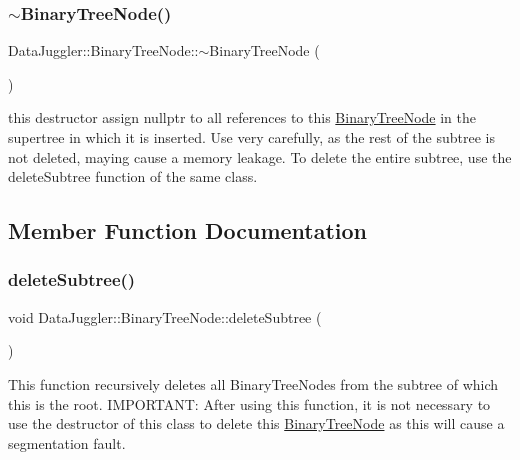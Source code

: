 \subsubsection{\texorpdfstring{$\sim$\+Binary\+Tree\+Node()}{~BinaryTreeNode()}}
{\footnotesize\ttfamily Data\+Juggler\+::\+Binary\+Tree\+Node\+::$\sim$\+Binary\+Tree\+Node (\begin{DoxyParamCaption}{ }\end{DoxyParamCaption})\hspace{0.3cm}{\ttfamily [virtual]}}

this destructor assign nullptr to all references to this \hyperlink{classDataJuggler_1_1BinaryTreeNode}{Binary\+Tree\+Node} in the supertree in which it is inserted. Use very carefully, as the rest of the subtree is not deleted, maying cause a memory leakage. To delete the entire subtree, use the delete\+Subtree function of the same class. 

\subsection{Member Function Documentation}
\mbox{\label{classDataJuggler_1_1BinaryTreeNode_a563663d605400e2a928df19fd086bf9a}} 
\subsubsection{\texorpdfstring{delete\+Subtree()}{deleteSubtree()}}
{\footnotesize\ttfamily void Data\+Juggler\+::\+Binary\+Tree\+Node\+::delete\+Subtree (\begin{DoxyParamCaption}{ }\end{DoxyParamCaption})\hspace{0.3cm}{\ttfamily [virtual]}}

This function recursively deletes all Binary\+Tree\+Nodes from the subtree of which this is the root. I\+M\+P\+O\+R\+T\+A\+NT\+: After using this function, it is not necessary to use the destructor of this class to delete this \hyperlink{classDataJuggler_1_1BinaryTreeNode}{Binary\+Tree\+Node} as this will cause a segmentation fault. \mbox{\label{classDataJuggler_1_1BinaryTreeNode_a98ff5ed818a8a679979adaae76fcbd8a}} 
